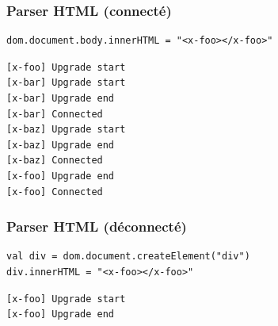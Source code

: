 \subsubsection{Parser HTML (connecté)}
\begin{lstlisting}
dom.document.body.innerHTML = "<x-foo></x-foo>"
\end{lstlisting}

\begin{lstlisting}
[x-foo] Upgrade start
[x-bar] Upgrade start
[x-bar] Upgrade end
[x-bar] Connected
[x-baz] Upgrade start
[x-baz] Upgrade end
[x-baz] Connected
[x-foo] Upgrade end
[x-foo] Connected
\end{lstlisting}


\subsubsection{Parser HTML (déconnecté)}
\begin{lstlisting}
val div = dom.document.createElement("div")
div.innerHTML = "<x-foo></x-foo>"
\end{lstlisting}

\begin{lstlisting}
[x-foo] Upgrade start
[x-foo] Upgrade end
\end{lstlisting}